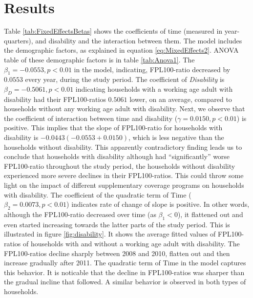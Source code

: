 \documentclass[11pt]{extarticle} %
\begin{document}
\section{Results}
Table \ref{tab:FixedEffectsBetas} shows the coefficients of time (measured in year-quarters), and disability and the interaction between them. The model includes the demographic factors, as explained in equation \ref{eq:MixedEffects2}. ANOVA table of these demographic factors is in table \ref{tab:Anova1}. The $\beta_1 = -0.0553, p < 0.01$ in the model, indicating, FPL100-ratio decreased by $0.0553$ every year, during the study period. The coefficient of {\emph{Disability}} is $\beta_D = -0.5061, p < 0.01$  indicating households with a working age adult with disability had their FPL100-ratios $0.5061$ lower, on an average, compared to households without any working age adult with disability. Next, we observe that the coefficient of interaction between time and disability ($\gamma = 0.0150, p < 0.01$) is positive. This implies that the slope of FPL100-ratio for households with disability is $-0.0443 (-0.0553 + 0.0150)$, which is less negative than the households without disability. This apparently contradictory finding leads us to conclude that households with disability although had ``significantly'' worse FPL100-ratio throughout the study period, the households without disability experienced more severe declines in their FPL100-ratios. This could throw some light on the impact of different supplementary coverage programs on households with disability. The coefficient of the quadratic term of Time ($\beta_2 = 0.0073, p < 0.01$) indicates rate of change of slope is positive. In other words, although the FPL100-ratio decreased over time (as $\beta_1 < 0$), it flattened out and even started increasing towards the latter parts of the study period. This is illustrated in figure \ref{fig:disability}. It shows the average fitted values of FPL100-ratios of households with and without a working age adult with disability. The FPL100-ratios decline sharply between 2008 and 2010, flatten out and then increase gradually after 2011. The quadratic term of Time in the model captures this behavior. It is noticable that the decline in FPL100-ratios was sharper than the gradual incline that followed. A similar behavior is observed in both types of households. 
\end{document}
